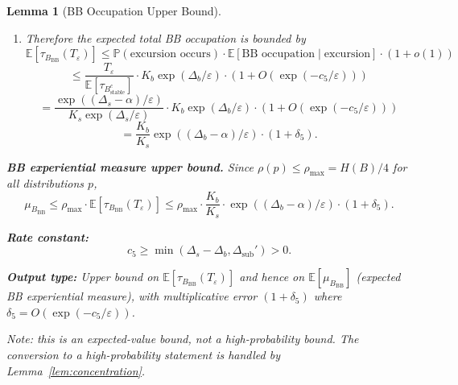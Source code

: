 \documentclass[11pt]{article}
\newtheorem{lemma}{Lemma}
\newcommand{\eps}{\varepsilon}
\newcommand{\Ds}{\Delta_s}
\newcommand{\Db}{\Delta_b}
\newcommand{\Bstable}{B_{\mathrm{stable}}}
\newcommand{\BBB}{B_{\mathrm{BB}}}
\newcommand{\Teps}{T_\eps}
\begin{document}
\begin{lemma}[BB Occupation Upper Bound]
\begin{enumerate}
\item Therefore the expected total BB occupation is bounded by
  \[
    \mathbb{E}[\tau_\BBB(\Teps)]
    \leq \mathbb{P}(\text{excursion occurs})
    \cdot \mathbb{E}[\text{BB occupation} \mid \text{excursion}]
    \cdot (1 + o(1))
  \]
  \[
    \leq \frac{\Teps}{\mathbb{E}[\tau_{\Bstable^c}]}
    \cdot K_b \exp(\Db/\eps) \cdot (1 + O(\exp(-c_5/\eps)))
  \]
  \[
    = \frac{\exp((\Ds - \alpha)/\eps)}{K_s \exp(\Ds/\eps)}
    \cdot K_b \exp(\Db/\eps)
    \cdot (1 + O(\exp(-c_5/\eps)))
  \]
  \begin{equation}\label{eq:bb-expected}
    = \frac{K_b}{K_s} \exp((\Db - \alpha)/\eps)
    \cdot (1 + \delta_5).
  \end{equation}
\end{enumerate}

\medskip
\textbf{BB experiential measure upper bound.}
Since $\rho(p) \leq \rho_{\max} = H(B)/4$ for all distributions $p$,
\begin{equation}\label{eq:mu-bb}
  \mu_\BBB \leq \rho_{\max} \cdot \mathbb{E}[\tau_\BBB(\Teps)]
  \leq \rho_{\max} \cdot \frac{K_b}{K_s}
  \cdot \exp((\Db - \alpha)/\eps) \cdot (1 + \delta_5).
\end{equation}

\medskip
\textbf{Rate constant:}
\begin{equation}\label{eq:c5}
  c_5 \geq \min(\Ds - \Db, \Delta_{\mathrm{sub}}') > 0.
\end{equation}

\medskip
\textbf{Output type:}
Upper bound on $\mathbb{E}[\tau_\BBB(\Teps)]$ and hence on
$\mathbb{E}[\mu_\BBB]$ (expected BB experiential measure), with
multiplicative error $(1 + \delta_5)$ where
$\delta_5 = O(\exp(-c_5/\eps))$.

Note: this is an expected-value bound, not a high-probability bound.
The conversion to a high-probability statement is handled by
Lemma~\ref{lem:concentration}.
\end{lemma}
\end{document}

